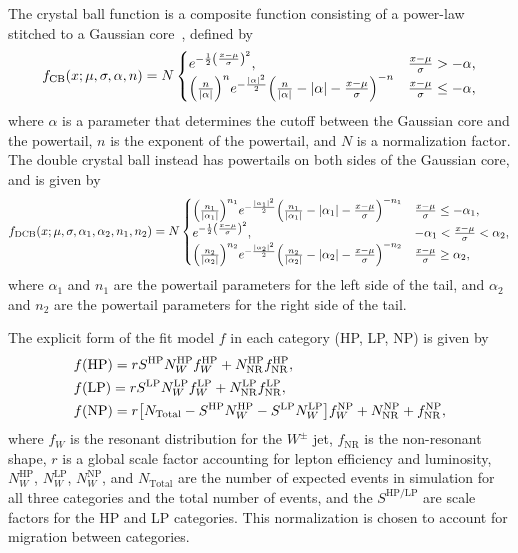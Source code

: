 The crystal ball function is a composite function consisting of a power-law stitched to a Gaussian core~\cite{Cheng_2016}, defined by
\begin{equation}
  f_\mathrm{CB}(x;\mu,\sigma,\alpha,n)=N
  \begin{cases}
    e^{-\frac{1}{2}\pqty{\frac{x-\mu}{\sigma}}^2}, & \frac{x-\mu}{\sigma}>-\alpha,\\
    \pqty{\frac{n}{|\alpha|}}^ne^{-\frac{|\alpha|^2}{2}}\pqty{\frac{n}{|\alpha|}-|\alpha|-\frac{x-\mu}{\sigma}}^{-n} & \frac{x-\mu}{\sigma}\leq-\alpha,
  \end{cases}
\end{equation}
where $\alpha$ is a parameter that determines the cutoff between the Gaussian core and the powertail, $n$ is the exponent of the powertail, and $N$ is a normalization factor.
The double crystal ball instead has powertails on both sides of the Gaussian core, and is given by
\begin{equation}
  f_\mathrm{DCB}(x;\mu,\sigma,\alpha_1,\alpha_2,n_1,n_2)=N
  \begin{cases}
    \pqty{\frac{n_1}{|\alpha_1|}}^{n_1}e^{-\frac{|\alpha_1|^2}{2}}\pqty{\frac{n_1}{|\alpha_1|}-|\alpha_1|-\frac{x-\mu}{\sigma}}^{-n_1} & \frac{x-\mu}{\sigma}\leq-\alpha_1,\\
    e^{-\frac{1}{2}\pqty{\frac{x-\mu}{\sigma}}^2}, & -\alpha_1<\frac{x-\mu}{\sigma}<\alpha_2,\\
    \pqty{\frac{n_2}{|\alpha_2|}}^{n_2}e^{-\frac{|\alpha_2|^2}{2}}\pqty{\frac{n_2}{|\alpha_2|}-|\alpha_2|-\frac{x-\mu}{\sigma}}^{-n_2} & \frac{x-\mu}{\sigma}\geq\alpha_2,
  \end{cases}
\end{equation}
where $\alpha_1$ and $n_1$ are the powertail parameters for the left side of the tail, and $\alpha_2$ and $n_2$ are the powertail parameters for the right side of the tail.

The explicit form of the fit model $f$ in each category (HP, LP, NP) is given by
\begin{align}
  & f(\mathrm{HP})=rS^\mathrm{HP}N_W^\mathrm{HP}f_W^\mathrm{HP}+N_\mathrm{NR}^\mathrm{HP}f_\mathrm{NR}^\mathrm{HP},\label{eq:VtagFit1}\\
  & f(\mathrm{LP})=rS^\mathrm{LP}N_W^\mathrm{LP}f_W^\mathrm{LP}+N_\mathrm{NR}^\mathrm{LP}f_\mathrm{NR}^\mathrm{LP},\label{eq:VtagFit2}\\
  & f(\mathrm{NP})=r\bqty{N_\mathrm{Total}-S^\mathrm{HP}N_W^\mathrm{HP}-S^\mathrm{LP}N_W^\mathrm{LP}}f_W^\mathrm{NP}+N_\mathrm{NR}^\mathrm{NP}+f_\mathrm{NR}^\mathrm{NP},\label{eq:VtagFit3}
\end{align}
where $f_W$ is the resonant distribution for the $W^\pm$ jet, $f_\mathrm{NR}$ is the non-resonant shape, $r$ is a global scale factor accounting for lepton efficiency and luminosity, $N_{W}^\mathrm{HP}$, $N_{W}^\mathrm{LP}$, $N_{W}^\mathrm{NP}$, and $N_\mathrm{Total}$ are the number of expected events in simulation for all three categories and the total number of events, and the $S^{\mathrm{HP}/\mathrm{LP}}$ are scale factors for the HP and LP categories.
This normalization is chosen to account for migration between categories.

